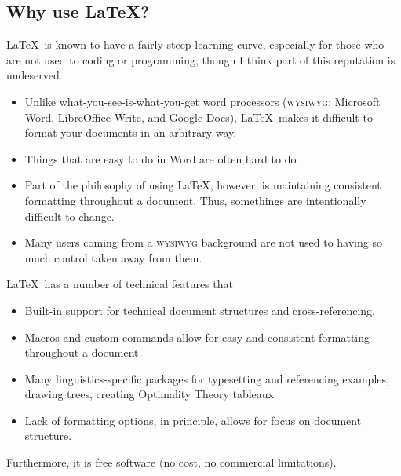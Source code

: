 \documentclass[11pt, letterpaper]{article}
\begin{document}
  
  \subsection{Why use \LaTeX?}
  
    \LaTeX\ is known to have a fairly steep learning curve, especially for those who are not used to coding or programming, though I think part of this reputation is undeserved.
    
      \begin{itemize}
	\item Unlike what-you-see-is-what-you-get word processors (\textsc{wysiwyg}; Microsoft Word, LibreOffice Write, and Google Docs), \LaTeX\ makes it difficult to format your documents in an arbitrary way.
	
	\item Things that are easy to do in Word are often hard to do 
	
	\item Part of the philosophy of using \LaTeX, however, is maintaining consistent formatting throughout a document. Thus, somethings are intentionally difficult to change.
	
	\item Many users coming from a \textsc{wysiwyg} background are not used to having so much control taken away from them.
	
      \end{itemize}

    \noindent \LaTeX\ has a number of technical features that 
  
      \begin{itemize}
	
	\item Built-in support for technical document structures and cross-referencing.
	
	\item Macros and custom commands allow for easy and consistent formatting throughout a document.
		
	\item Many linguistics-specific packages for typesetting and referencing examples, drawing trees, creating Optimality Theory tableaux
	
	\item Lack of formatting options, in principle, allows for focus on document structure.
	
      \end{itemize}
      
    \noindent Furthermore, it is free software (no cost, no commercial limitations).
    
\end{document}
